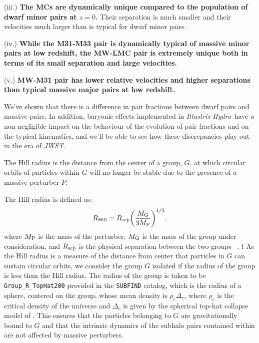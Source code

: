 \documentclass[twocolumn]{aastex63}
\newcommand\IH{\textit{Illustris-Hydro}}
\begin{document}
(iii.) \textbf{The MCs are dynamically unique compared to the population of dwarf minor pairs at $z=0$.} Their separation is much smaller and their velocities much larger than is typical for dwarf minor pairs.

(iv.) \textbf{While the M31-M33 pair is dynamically typical of massive minor pairs at low redshift, the MW-LMC pair is extremely unique both in terms of its small separation and large velocities.} 

(v.) \textbf{MW-M31 pair has lower relative velocities and higher separations than typical massive major pairs at low redshift.}

We've shown that there is a difference in pair fractions between dwarf pairs and massive pairs. In addition, baryonic effects implemented in \IH\ have a non-negligible impact on the behaviour of the evolution of pair fractions and on the typical kinematics, and we'll be able to see how these discrepancies play out in the era of \textit{JWST.} 







The Hill radius is the distance from the center of a group, $G$, at which circular orbits of particles within $G$ will no longer be stable due to the presence of a massive perturber $P$.

The Hill radius is defined as:
\begin{equation}
  R_{\rm Hill} = R_{\rm sep} \bigg( \frac{ M_{\rm G} }{ 3M_{\rm P} } \bigg)^{1/3},
\end{equation}
where $M_{\rm P}$ is the mass of the perturber, $M_{\rm G}$ is the mass of the group under consideration, and $R_{\rm sep}$ is the physical separation between the two groups ~\citep{hahn09}.
\l
As the Hill radius is a measure of the distance from center that particles in $G$ can sustain circular orbits, we consider the group $G$ isolated if the radius of the group is less than the Hill radius. 
The radius of the group is taken to be \texttt{Group\_R\_TopHat200} provided in the \texttt{SUBFIND} catalog, which is the radius of a sphere, centered on the group, whose mean density is $\rho_c \Delta_c$, where $\rho_c$ is the critical density of the universe and $\Delta_c$ is given by the spherical top-hat collapse model of \citet{brynorman98}. This ensures that the particles belonging to $G$ are gravitationally bound to $G$ and that the intrinsic dynamics of the subhalo pairs contained within are not affected by massive perturbers.
\end{document}
